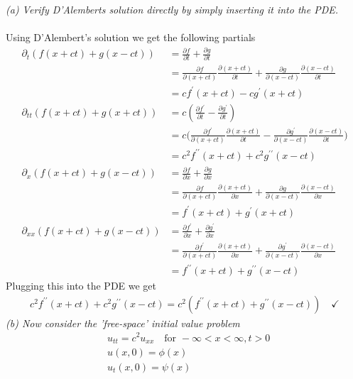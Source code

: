 \documentclass[12pt]{article}
\theoremstyle{remark}
\begin{document}
\noindent \textit{(a) Verify D'Alemberts solution directly by simply inserting it into the PDE.} \\ \\
Using D'Alembert's solution we get the following partials
\begin{align*}
\partial_{t}(f(x+ct) + g(x - ct)) & = \frac{\partial f}{\partial t} + \frac{\partial g}{\partial t} \\
& = \frac{\partial f}{\partial (x+ct)}\frac{\partial (x+ct)}{\partial t} + \frac{\partial g}{\partial (x-ct)}\frac{\partial (x-ct)}{\partial t} \\
& = cf^\prime(x+ct) - cg^\prime(x+ct) \\
\partial_{tt}(f(x+ct) + g(x+ct)) & = c(\frac{\partial f^\prime}{\partial t} - \frac{\partial g^\prime}{\partial t}) \\
& = c\bigg(\frac{\partial f^\prime}{\partial (x+ct)}\frac{\partial (x+ct)}{\partial t} - \frac{\partial g^\prime}{\partial (x-ct)}\frac{\partial (x-ct)}{\partial t}\bigg) \\
& = c^2f^{\prime\prime}(x+ct) + c^2g^{\prime\prime}(x-ct) \\
\partial_{x}(f(x+ct) + g(x - ct)) & = \frac{\partial f}{\partial x} + \frac{\partial g}{\partial x} \\
& = \frac{\partial f}{\partial (x+ct)}\frac{\partial (x+ct)}{\partial x} + \frac{\partial g}{\partial (x-ct)}\frac{\partial (x-ct)}{\partial x} \\
& = f^\prime(x+ct) + g^\prime(x+ct) \\
\partial_{xx}(f(x+ct) + g(x-ct)) & = \frac{\partial f^\prime}{\partial x} + \frac{\partial g^\prime}{\partial x} \\
& = \frac{\partial f^\prime}{\partial (x+ct)}\frac{\partial (x+ct)}{\partial x} + \frac{\partial g^\prime}{\partial (x-ct)}\frac{\partial (x-ct)}{\partial x} \\
& = f^{\prime\prime}(x+ct) + g^{\prime\prime}(x-ct)
\end{align*}
Plugging this into the PDE we get
\begin{align*}
c^2f^{\prime\prime}(x+ct) + c^2g^{\prime\prime}(x-ct) = c^2(f^{\prime\prime}(x+ct) + g^{\prime\prime}(x-ct)) \quad \checkmark
\end{align*}
\textit{(b) Now consider the 'free-space' initial value problem}
\begin{align*} 
& u_{tt} = c^2u_{xx} \quad \text{for } -\infty < x < \infty, t > 0 \\
& u(x,0) = \phi (x) \\
& u_t(x,0) = \psi (x) 
\end{align*}
\end{document}
